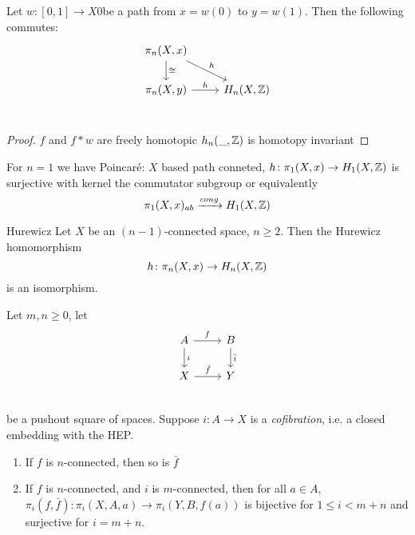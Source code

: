 \documentclass[language=english]{TemplateLecture}
\begin{document}
\begin{lem}
    Let \(w\colon [0,1]\to X\)0be a path from \(x = w(0)\) to \(y = w(1)\). Then the following commutes:
    \[\begin{tikzcd}
        \pi_n(X,x) \ar[d, "\cong"] \ar[rd, "h"] & \\
        \pi_n(X,y) \ar[r, "h"] & H_n(X, \iz) \\ 
    \end{tikzcd}\]
\end{lem}

\begin{proof}
    \(f\) and \(f *w\) are freely homotopic \(h_n(\_, \mathbb{Z})\) is homotopy invariant
\end{proof}

For \(n = 1\) we have Poincaré: \(X\) based path conneted, \(h\colon \pi_1(X,x)\to H_1(X,\mathbb{Z})\) is surjective with kernel the commutator subgroup or equivalently
\[\pi_1(X,x)_{ab} \xrightarrow{cong} H_1(X,\mathbb{Z})\]

\begin{thm}{}{Hurewicz}
    Let \(X\) be an \((n-1)\)-connected space, \(n\geq 2\). Then the Hurewicz homomorphism
    \[h\colon\pi_n(X,x) \to H_n(X,\mathbb{Z})\]
    is an isomorphism.
\end{thm}

\begin{proposition}
    Let \(m,n \geq 0\), let
    \[\begin{tikzcd}
        A \ar[r, "f"] \ar[d, "i"] & B \ar[d, "\bar i"]\\
        X \ar[r, "\bar f"] & Y \\
    \end{tikzcd}\]
    be a pushout square of spaces. Suppose \(i\colon A \to X\) is a \emph{cofibration}, i.e. a closed embedding with the HEP.
    \begin{enumerate}
        \item If \(f\) is \(n\)-connected, then so is \(\bar f\)
        \item If \(f\) is \(n\)-connected, and \(i\) is \(m\)-connected, then for all \(a \in A\), \(\pi_i(f, \bar f) \colon \pi_i(X,A, a) \to \pi_i(Y, B, f(a))\) is bijective for \(1 \leq i < m+n\) and surjective for \(i = m+n\).
    \end{enumerate}
\end{proposition}
\end{document}
